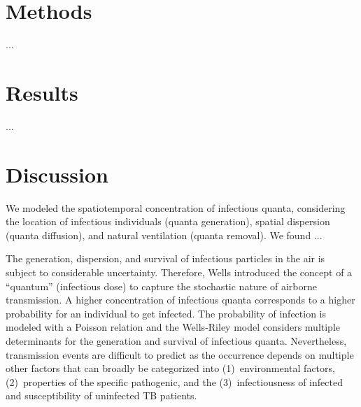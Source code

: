 \documentclass[fleqn,11pt]{wlscirep}
\begin{document}
\newpage

\section{Methods}

...


\newpage

\section{Results}

...


\FloatBarrier

\newpage

\section{Discussion}

We modeled the spatiotemporal concentration of infectious quanta, considering the location of infectious individuals (quanta generation), spatial dispersion (quanta diffusion), and natural ventilation (quanta removal). We found ... 




The generation, dispersion, and survival of infectious particles in the air is subject to considerable uncertainty. Therefore, Wells\cite{Wells1955} introduced the concept of a ``quantum'' (infectious dose) to capture the stochastic nature of airborne transmission. A higher concentration of infectious quanta corresponds to a higher probability for an individual to get infected. The probability of infection is modeled with a Poisson relation and the Wells-Riley model considers multiple determinants for the generation and survival of infectious quanta. Nevertheless, transmission events are difficult to predict as the occurrence depends on multiple other factors that can broadly be categorized into (1)~environmental factors, (2)~properties of the specific pathogenic, and the (3)~infectiousness of infected and susceptibility of uninfected TB patients. 
\end{document}
